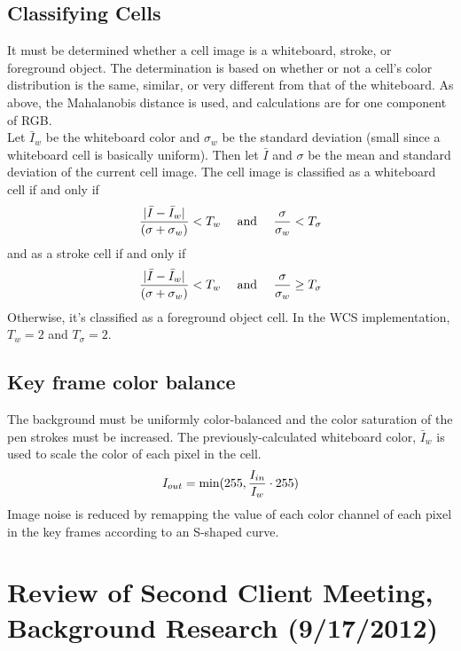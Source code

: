 \documentclass[]{article}
\begin{document}
{	\subsection*{Classifying Cells}
It must be determined whether a cell image is a whiteboard, stroke, or foreground object.  The determination is based on whether or not a cell's color distribution is the same, similar, or very different from that of the whiteboard.  As above, the Mahalanobis distance is used, and calculations are for one component of RGB.  \\
\indent Let $\bar{I}_w$ be the whiteboard color and $\sigma_w$ be the standard deviation (small since a whiteboard cell is basically uniform).  Then let $\bar{I}$ and $\sigma$ be the mean and standard deviation of the current cell image.  The cell image is classified as a whiteboard cell if and only if \[ {|\bar{I} - \bar{I}_w| \over (\sigma + \sigma_w)}<T_w \quad \textrm{ and } \quad  {\sigma \over \sigma_w }< T_\sigma \] 
and as a stroke cell if and only if
\[{|\bar{I}-\bar{I}_w| \over (\sigma + \sigma_w)}<T_w \quad \textrm{ and } \quad {\sigma \over \sigma_w} \geq T_\sigma \] 
Otherwise, it's classified as a foreground object cell.  In the WCS implementation, $T_w=2$ and $T_\sigma=2$.
	\subsection*{Key frame color balance}
The background must be uniformly color-balanced and the color saturation of the pen strokes must be increased.  The previously-calculated whiteboard color, $\bar{I}_w$ is used to scale the color of each pixel in the cell. \[ I_{out} = \textrm{min} (255, {I_{in} \over I_w} \cdot 255) \]
Image noise is reduced by remapping the value of each color channel of each pixel in the key frames according to an S-shaped curve.

	\section{Review of Second Client Meeting, Background Research (9/17/2012)}

}
\end{document}
